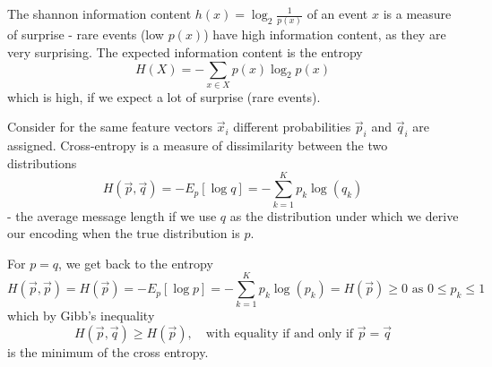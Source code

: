 
The shannon information content $h(x) = \log_2 \frac{1}{p(x)}$ of an event $x$
is a measure of surprise - rare events (low $p(x)$) have high information content,
as they are very surprising. The expected information content is the entropy
\begin{equation}
    H(X) = -\sum_{x \in X} p(x) \log_2 p(x)
\end{equation}
which is high, if we expect a lot of surprise (rare events).

Consider for the same feature vectors $\vec{x}_i$ different probabilities $\vec{p}_i$ and $\vec{q}_i$
are assigned. Cross-entropy is a measure of dissimilarity between the two distributions
\begin{equation}
    H(\vec{p}, \vec{q}) = -E_p[\log{q}] =-\sum_{k=1}^K p_k \log(q_k)
\end{equation}
- the average message length if we use $q$ as the distribution under which
we derive our encoding when the true distribution is $p$.

For $p = q$, we get back to the entropy
\begin{equation}
    H(\vec{p}, \vec{p}) = H(\vec{p}) = -E_p[\log{p}] =-\sum_{k=1}^K p_k \log(p_k) = H(\vec{p}) \geq 0 \text{ as } 0 \leq p_k \leq 1
\end{equation}
which by Gibb's inequality
\begin{equation}
    H(\vec{p}, \vec{q}) \geq H(\vec{p}), \quad \text{with equality if and only if } \vec{p} = \vec{q}
\end{equation}
is the minimum of the cross entropy.


